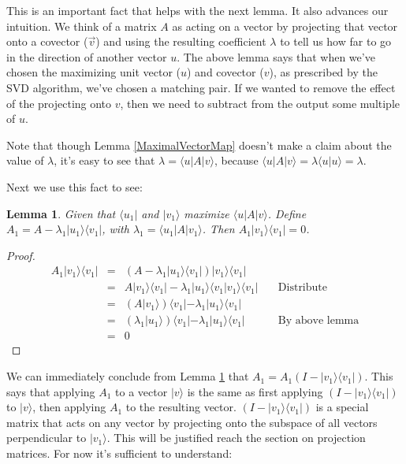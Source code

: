 \documentclass{amsbook}
\newtheorem{lemma}[theorem]{Lemma}
\begin{document}
This is an important fact that helps with the next lemma.  It also advances our intuition.  We think of a matrix $A$ as acting on a vector by projecting that vector onto a covector ($\vec v$) and using the resulting coefficient $\lambda$ to tell us how far to go in the direction of another vector $u$.  The above lemma says that when we've chosen the maximizing unit vector ($ u $) and covector ($ v $), as prescribed by the SVD algorithm, we've chosen a matching pair.  If we wanted to remove the effect of the projecting onto $ v $, then we need to subtract from the output some multiple of $ u $.

Note that though Lemma \ref{MaximalVectorMap} doesn't make a claim about the value of $\lambda$, it's easy to see that $\lambda=\langle u |A| v\rangle$, because $\langle u|A|v\rangle = \lambda\langle u|u\rangle = \lambda$.

Next we use this fact to see:

\begin{lemma}
\label{A1ProjectionZero}
Given that $\langle u_1|$ and $|v_1\rangle$ maximize $\langle u|A|v\rangle$.  Define $A_1=A-\lambda_1| u _1\rangle\langle v _1|$, with $\lambda_1=\langle u_1|A|v_1\rangle$.  Then $A_1| v _1\rangle\langle v _1|=0$.
\end{lemma}

\begin{proof}
$$
\begin{array}{rcll}
A_1| v _1\rangle\langle v _1| &=& \left(A-\lambda_1| u _1\rangle\langle v _1|\right)| v _1\rangle\langle v _1|& \\
&=& A| v _1\rangle\langle v _1| - \lambda_1| u _1\rangle\langle v _1| v _1\rangle\langle v _1| & \quad\text{Distribute}\\
&=& \left(A| v _1\rangle\right)\langle v _1| - \lambda_1| u _1\rangle\langle v _1|& \\
&=& \left(\lambda_1| u _1\rangle\right)\langle v _1| - \lambda_1| u _1\rangle\langle v _1|&\quad\text{By above lemma} \\
&=& 0
\end{array}
$$
\end{proof}

We can immediately conclude from Lemma \ref{A1ProjectionZero} that $A_1=A_1\left(I-| v _1\rangle\langle v _1|\right)$.  This says that applying $A_1$ to a vector $| v \rangle$ is the same as first applying $\left(I-| v _1\rangle\langle v _1|\right)$ to $| v \rangle$, then applying $A_1$ to the resulting vector.  $\left(I-| v _1\rangle\langle v _1|\right)$ is a special matrix that acts on any vector by projecting onto the subspace of all vectors perpendicular to $| v _1\rangle$.  This will be justified reach the section on projection matrices.  For now it's sufficient to understand:
\end{document}
